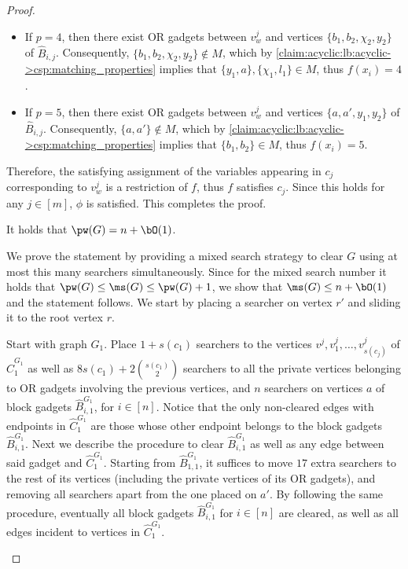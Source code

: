 \begin{proof}
\begin{nestedproof}
\begin{itemize}
                \item If $p = 4$,
                then there exist OR gadgets between $v^j_w$ and vertices $\{b_1, b_2, \chi_2, y_2\}$ of $\hat{B}_{i,j}$.
                Consequently, $\{b_1, b_2, \chi_2, y_2\} \notin M$,
                which by \cref{claim:acyclic:lb:acyclic->csp:matching_properties} implies that $\{y_1,a\}, \{\chi_1,l_1\} \in M$,
                thus $f(x_i) = 4$.

                \item If $p = 5$,
                then there exist OR gadgets between $v^j_w$ and vertices $\{a, a',y_1, y_2\}$ of $\hat{B}_{i,j}$.
                Consequently, $\{a,a'\} \notin M$,
                which by \cref{claim:acyclic:lb:acyclic->csp:matching_properties} implies that $\{b_1,b_2\} \in M$,
                thus $f(x_i) = 5$.
            \end{itemize}
            Therefore, the satisfying assignment of the variables appearing in $c_j$ corresponding to $v^j_w$
            is a restriction of $f$, thus $f$ satisfies $c_j$.
            Since this holds for any $j \in [m]$, $\phi$ is satisfied.
            This completes the proof.
        \end{nestedproof}


        \begin{lemma}\label{lem:acyclic:lb:pathwidth}
            It holds that $\pw(G) = n + \bO(1)$.
        \end{lemma}


        \begin{nestedproof}
            We prove the statement by providing a mixed search strategy to clear $G$ using at most this many searchers simultaneously.
            Since for the mixed search number \ms{} it holds that $\pw(G) \leq \ms(G) \leq \pw(G) + 1$,
            we show that $\ms(G) \leq n + \bO(1)$ and the statement follows.
            We start by placing a searcher on vertex $r'$ and sliding it to the root vertex $r$.

            Start with graph $G_1$.
            Place $1 + s(c_1)$ searchers to the vertices $v^j, v^j_1, \ldots, v^j_{s(c_j)}$ of $\hat{C}^{G_1}_1$
            as well as $8 s(c_1) + 2 \binom{s(c_1)}{2}$ searchers to all the private vertices belonging to OR gadgets involving the previous vertices,
            and $n$ searchers on vertices $a$ of block gadgets $\hat{B}^{G_1}_{i,1}$, for $i \in [n]$.
            Notice that the only non-cleared edges with endpoints in $\hat{C}^{G_1}_1$ are those whose other endpoint belongs to the block gadgets $\hat{B}^{G_1}_{i,1}$.
            Next we describe the procedure to clear $\hat{B}^{G_1}_{i,1}$ as well as any edge between said gadget and $\hat{C}^{G_1}_1$.
            Starting from $\hat{B}^{G_1}_{1,1}$, it suffices to move $17$ extra searchers
            to the rest of its vertices (including the private vertices of its OR gadgets),
            and removing all searchers apart from the one placed on $a'$.
            By following the same procedure, eventually all block gadgets $\hat{B}^{G_1}_{i,1}$ for $i \in [n]$ are cleared, as well as all edges incident to vertices in $\hat{C}^{G_1}_1$.


\end{nestedproof}
\end{proof}
